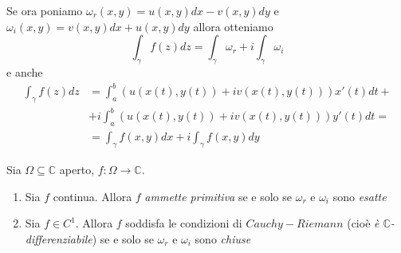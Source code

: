 Se ora poniamo \(\omega_{r}(x,y) = u(x,y)dx - v(x,y)dy \) e \(\omega_{i}(x,y) =
v{(x,y)}dx + u{(x,y)}dy\) allora otteniamo
\[
    \int_{\gamma} f(z) dz = \int_{\gamma} \omega_{r} + i \int_{\gamma}
    \omega_{i}
\]
e anche 
\begin{align*}
    \int_{\gamma} f(z) dz &= \int_{a}^{b} {\left( u(x{(t)}, y{(t)}) + i v(x(t),
            y(t)) \right)} x'(t) dt + \\ &+ i \int_{a}^{b} {\left( u(x{(t)}, y{(t)}) +
            i v(x(t), y(t)) \right)} y'(t) dt = \\ &= \int_{\gamma} f(x,y) dx + i
            \int_{\gamma} f(x,y) dy
\end{align*}

\begin{proposition}\label{prp:forme-funzioni}
    Sia \(\Omega \subseteq \mathbb{C} \) aperto, \(f: \Omega \to \mathbb{C}\). 
\begin{enumerate}[label = \alph*)]
    \item Sia \(f\) continua. Allora \(f\) \emph{ammette primitiva} se e solo se
        \(\omega_r\) e \(\omega_i\) sono \emph{esatte}
    \item Sia \(f \in C^{1}\). Allora \(f\) soddisfa le condizioni di
        \(Cauchy-Riemann\) (cioè \emph{è \(\mathbb{C}\)-differenziabile}) se e solo se
        \(\omega_r\) e \(\omega_i\) sono \emph{chiuse}
\end{enumerate}
\end{proposition}
